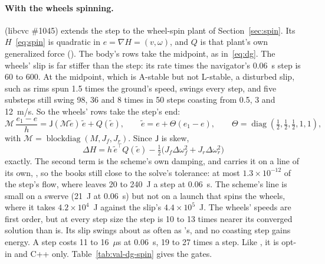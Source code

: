 \documentclass[11pt]{article}
\theoremstyle{remark}
\newcommand{\J}{\mathsf J}
\newcommand{\T}{^{\top}}
\begin{document}
\paragraph{With the wheels spinning.}  (libcvc \#1045) extends the
step to the wheel-spin plant of Section~\ref{sec:spin}. Its $H$~\eqref{eq:spin} is quadratic in
$e=\nabla H=(v,\omega)$, and $Q$ is that plant's own generalized force
(). The body's rows take the midpoint, as in~\eqref{eq:dg}. The
wheels' slip is far stiffer than the step: its rate times the navigator's 0.06~s step is 60 to 600.
At the midpoint, which is A-stable but not L-stable, a disturbed slip, such as rims spun 1.5 times
the ground's speed, swings every step, and five substeps still swing 98, 36 and 8 times in 50
steps coasting from 0.5, 3 and 12~m/s. So the wheels' rows take the step's end:
\begin{equation}
  \mathcal M\,\frac{e_1-e}{h}=\J(\mathcal M\tilde e)\,\tilde e+Q(\tilde e),\qquad
  \tilde e=e+\Theta(e_1-e),\qquad \Theta=\operatorname{diag}(\tfrac12,\tfrac12,\tfrac12,1,1),
  \label{eq:dg-spin}
\end{equation}
with $\mathcal M=\operatorname{blockdiag}(M,J_f,J_r)$. Since $\J$ is skew,
\begin{equation*}
  \Delta H=h\,\tilde e\T Q(\tilde e)-\tfrac12\big(J_f\Delta\omega_f^2+J_r\Delta\omega_r^2\big)
\end{equation*}
exactly. The second term is the scheme's own damping, and 
carries it on a line of its own, , so the books still close to the solve's tolerance:
at most $1.3\times10^{-12}$ of the step's flow, where  leaves 20 to 240~J a
step at 0.06~s. The scheme's line is small on a swerve (21~J at 0.06~s) but not on a launch that
spins the wheels, where it takes $4.2\times10^{4}$~J against the slip's $4.4\times10^{5}$~J. The
wheels' speeds are first order, but at every step size the step is 10 to 13 times nearer its
converged solution than  is. Its slip swings about as often as
's, and no coasting step gains energy. A step costs 11 to 16~$\mu$s at
0.06~s, 19 to 27 times a  step. Like , it is opt-in
and C++ only. Table~\ref{tab:val-dg-spin} gives the gates.
\end{document}
